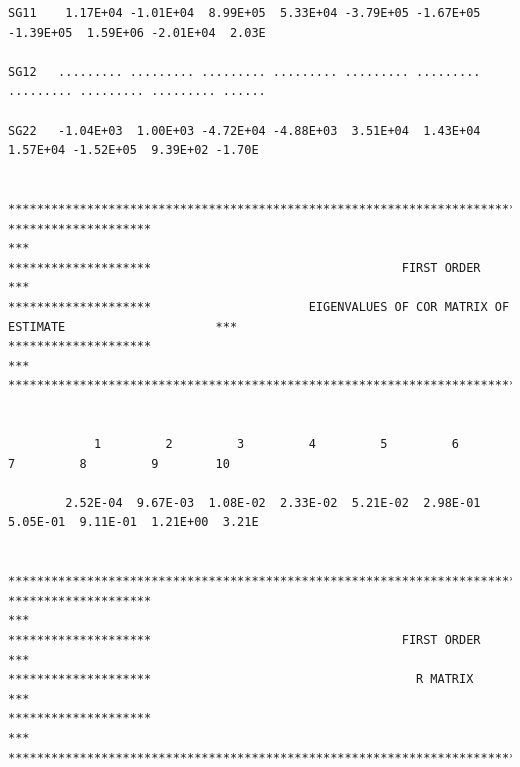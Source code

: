 \documentclass[
  10pt,
]{krantz}
\begin{document}
\begin{verbatim}
SG11    1.17E+04 -1.01E+04  8.99E+05  5.33E+04 -3.79E+05 -1.67E+05 -1.39E+05  1.59E+06 -2.01E+04  2.03E
                                                                                                       
SG12   ......... ......... ......... ......... ......... ......... ......... ......... ......... ......
                                                                                                       
SG22   -1.04E+03  1.00E+03 -4.72E+04 -4.88E+03  3.51E+04  1.43E+04  1.57E+04 -1.52E+05  9.39E+02 -1.70E
                                                                                                       
                                                                                                       
*******************************************************************************************************
********************                                                                                ***
********************                                   FIRST ORDER                                  ***
********************                      EIGENVALUES OF COR MATRIX OF ESTIMATE                     ***
********************                                                                                ***
*******************************************************************************************************
                                                                                                       
                                                                                                       
            1         2         3         4         5         6         7         8         9        10
                                                                                                       
        2.52E-04  9.67E-03  1.08E-02  2.33E-02  5.21E-02  2.98E-01  5.05E-01  9.11E-01  1.21E+00  3.21E
                                                                                                       
                                                                                                       
*******************************************************************************************************
********************                                                                                ***
********************                                   FIRST ORDER                                  ***
********************                                     R MATRIX                                   ***
********************                                                                                ***
*******************************************************************************************************
                                                                                                       

\end{verbatim}
\end{document}
